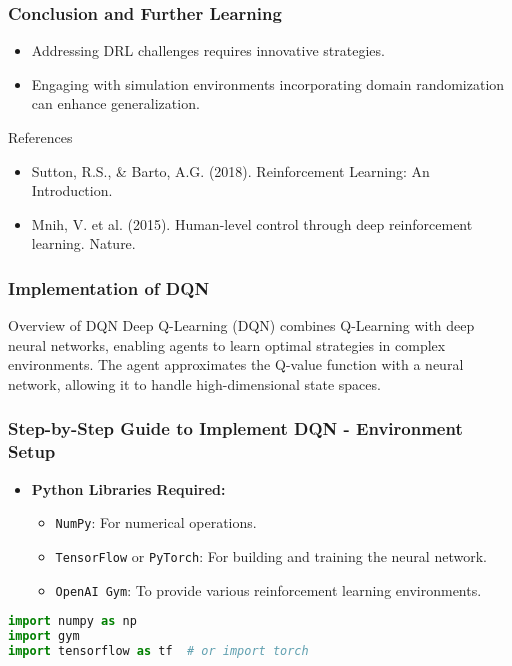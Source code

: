 \documentclass[aspectratio=169]{beamer}
\begin{document}
\begin{frame}[fragile]
    \frametitle{Conclusion and Further Learning}
    \begin{itemize}
        \item Addressing DRL challenges requires innovative strategies. 
        \item Engaging with simulation environments incorporating domain randomization can enhance generalization.
    \end{itemize}
    \begin{block}{References}
        \begin{itemize}
            \item Sutton, R.S., \& Barto, A.G. (2018). Reinforcement Learning: An Introduction.
            \item Mnih, V. et al. (2015). Human-level control through deep reinforcement learning. Nature.
        \end{itemize}
    \end{block}
\end{frame}

\begin{frame}
    \frametitle{Implementation of DQN}
    \begin{block}{Overview of DQN}
        Deep Q-Learning (DQN) combines Q-Learning with deep neural networks, enabling agents to learn optimal strategies in complex environments. The agent approximates the Q-value function with a neural network, allowing it to handle high-dimensional state spaces.
    \end{block}
\end{frame}

\begin{frame}[fragile]
    \frametitle{Step-by-Step Guide to Implement DQN - Environment Setup}
    \begin{itemize}
        \item \textbf{Python Libraries Required:}
        \begin{itemize}
            \item \texttt{NumPy}: For numerical operations.
            \item \texttt{TensorFlow} or \texttt{PyTorch}: For building and training the neural network.
            \item \texttt{OpenAI Gym}: To provide various reinforcement learning environments.
        \end{itemize}
    \end{itemize}
    
    \begin{lstlisting}[language=Python]
import numpy as np
import gym
import tensorflow as tf  # or import torch
    \end{lstlisting}
\end{frame}
\end{document}
